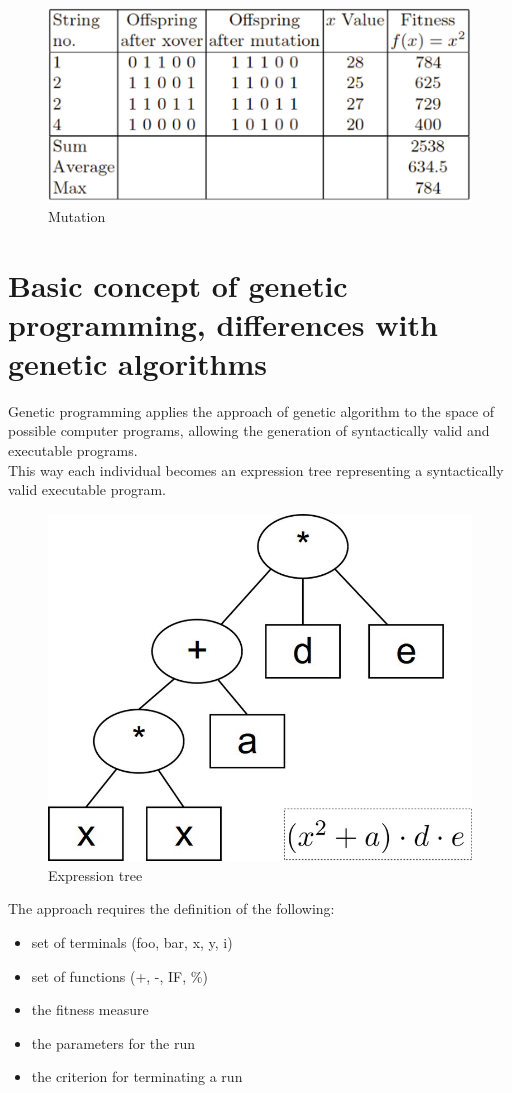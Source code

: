 \documentclass[a4paper,12pt,answers]{article}
\begin{document}
	\begin{figure}[H]
		\centering
		\includegraphics[width=0.7\linewidth]{goldberg_mutation}
		\caption{Mutation}
		\label{fig:goldbergmutation}
	\end{figure}
	
	
	
	\newpage
	\section{Basic concept of genetic programming, differences with genetic algorithms}
	Genetic programming applies the approach of genetic algorithm to the space of possible computer programs, allowing the generation of syntactically valid and executable programs.
	\\[4pt]
	\noindent
	This way each individual becomes an expression tree representing a syntactically valid executable program.
	
	\begin{figure}[H]
		\centering
		\includegraphics[width=0.3\linewidth]{images/expr_tree}
		\caption{Expression tree}
		\label{fig:exprtree}
	\end{figure}
	\noindent
	The approach requires the definition of the following:
	
	\begin{itemize}
		\item set of terminals (foo, bar, x, y, i)
		\item set of functions (+, -, IF, \%)
		\item the fitness measure 
		\item the parameters for the run
		\item the criterion for terminating a run
	\end{itemize}
	
\end{document}
